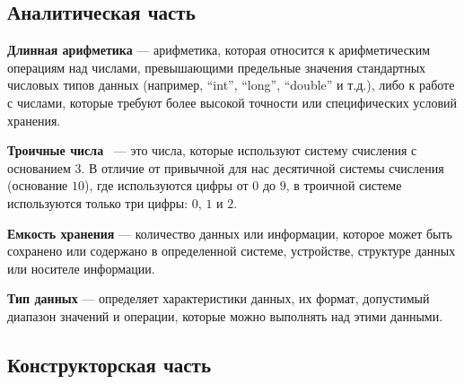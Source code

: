 \documentclass[12pt, a4paper]{article}
\begin{document}
\newpage
\begin{center}
   \section{Аналитическая часть} 
\end{center}

\textbf{Длинная арифметика} --- арифметика, которая относится к арифметическим операциям над числами, превышающими предельные значения стандартных числовых типов данных (например, ``int'', ``long'', ``double'' и т.д.), либо к работе с числами, которые требуют более высокой точности или специфических условий хранения.

\textbf{Троичные числа}~\cite{book} --- это числа, которые используют систему счисления с основанием $3$. В отличие от привычной для нас десятичной системы счисления (основание $10$), где используются цифры от $0$ до $9$, в троичной системе используются только три цифры: $0$, $1$ и $2$.

\textbf{Емкость хранения} --- количество данных или информации, которое может быть сохранено или содержано в определенной системе, устройстве, структуре данных или носителе информации.

\textbf{Тип данных} --- определяет характеристики данных, их формат, допустимый диапазон значений и операции, которые можно выполнять над этими данными.

\newpage
\begin{center}
    \section{Конструкторская часть}
\end{center}
\end{document}
